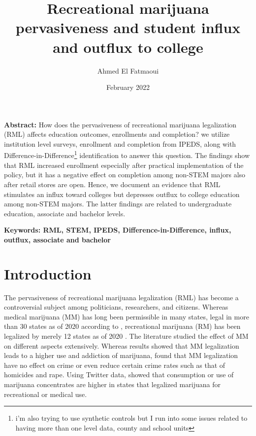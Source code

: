 \documentclass[12pt]{article}%
\begin{document}
\setcounter{page}{0}
\title{Recreational marijuana pervasiveness and student influx and outflux to college }
\author{Ahmed El Fatmaoui}

\date{February 2022}
\maketitle
\thispagestyle{empty}




\singlespacing
\textbf{Abstract:} 
How does the pervasiveness of recreational marijuana legalization (RML) affects education outcomes, enrollments and completion? we utilize  institution level surveys, enrollment and completion from IPEDS, along with Difference-in-Difference\footnote{i'm also trying to use synthetic controls but I run into some issues related to having more than one level data, county and school units} identification to answer this question. The findings show that RML increased enrollment especially after practical implementation of the policy, but it has a negative effect on completion among non-STEM majors also after retail stores are open. Hence, we document an evidence that RML stimulates an influx toward colleges but depresses outflux to college education among non-STEM majors. The latter findings are related to undergraduate education, associate and bachelor levels. 
 

\strut
 

\noindent \textbf{Keywords: RML, STEM, IPEDS, Difference-in-Difference, influx, outflux, associate and bachelor} 

\noindent \textbf{} 


\newpage
\doublespacing
\section{Introduction}

The pervasiveness of recreational marijuana legalization (RML) has become a controversial subject among politicians, researchers, and citizens. 
Whereas medical marijuana (MM) has long been permissible in many states, legal in more than 30 states as of 2020 according to \cite{kinaSUR}, recreational marijuana (RM) has been legalized by merely 12 states as of 2020 \citep{kinaSUR}. The literature studied the effect of MM on different aspects extensively. Whereas\cite{wen2015effect,cerda2012medical,martins2016state} results showed that MM legalization leads to a higher use and addiction of marijuana, \cite{morris2014effect, gavrilova2019legal}  found that MM legalization have no effect on crime or even reduce certain crime rates such as that of  homicides and rape. Using Twitter data, \cite{kinaSUR} showed that consumption or use of marijuana concentrates are higher in states that legalized marijuana for recreational or medical use.  
\end{document}
